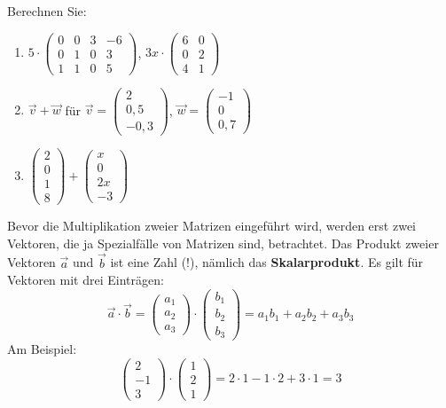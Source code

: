 \begin{graukasten}
  Berechnen Sie:
  \begin{enumerate}[label=\alph*)]
    \item $5 \cdot \begin{pmatrix} 0 & 0 & 3 & -6 \\ 0 & 1 & 0 & 3 \\ 1 & 1 & 0 & 5 \end{pmatrix}$, \quad $3x \cdot \begin{pmatrix} 6 & 0 \\ 0 & 2 \\ 4 & 1 \end{pmatrix}$
    \item $\vec{v} + \vec{w}$ für $\vec{v} = \begin{pmatrix} 2 \\ 0{,}5 \\ -0{,}3 \end{pmatrix}$, $\vec{w} = \begin{pmatrix} -1 \\ 0 \\ 0{,}7 \end{pmatrix}$
    \item $\begin{pmatrix} 2 \\ 0 \\ 1 \\ 8 \end{pmatrix} + \begin{pmatrix} x \\ 0 \\ 2x \\ -3 \end{pmatrix}$
  \end{enumerate}
\end{graukasten}

Bevor die Multiplikation zweier Matrizen eingeführt wird, werden erst zwei Vektoren, die ja Spezialfälle von Matrizen sind, betrachtet. Das Produkt zweier Vektoren $\vec{a}$ und $\vec{b}$ ist eine Zahl (!), nämlich das \textbf{Skalarprodukt}. Es gilt für Vektoren mit drei Einträgen:
\[ \vec{a} \cdot \vec{b} = \begin{pmatrix} a_1 \\ a_2 \\ a_3 \end{pmatrix} \cdot \begin{pmatrix} b_1 \\ b_2 \\ b_3 \end{pmatrix} = a_1 b_1 + a_2 b_2 + a_3 b_3 \]
Am Beispiel:
\[ \begin{pmatrix} 2 \\ -1 \\ 3 \end{pmatrix} \cdot \begin{pmatrix} 1 \\ 2 \\ 1 \end{pmatrix} = 2 \cdot 1 - 1 \cdot 2 + 3 \cdot 1 = 3 \]

